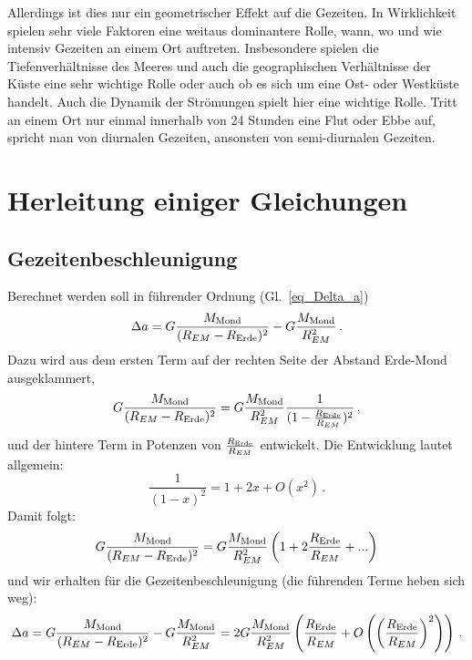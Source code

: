 Allerdings ist dies nur ein geometrischer Effekt auf die Gezeiten. In Wirklichkeit spielen
sehr viele Faktoren eine weitaus dominantere Rolle, wann, wo und wie intensiv Gezeiten an
einem Ort auftreten. Insbesondere spielen die Tiefenverh\"altnisse des Meeres und
auch die geographischen Verh\"altnisse der K\"uste eine sehr wichtige Rolle oder auch
ob es sich um eine Ost- oder Westk\"uste handelt. Auch die Dynamik der Str\"omungen spielt
hier eine wichtige Rolle. Tritt an einem Ort nur einmal innerhalb von 24 Stunden eine Flut oder Ebbe
auf, spricht man von diurnalen Gezeiten, ansonsten von semi-diurnalen Gezeiten. 


\section{Herleitung einiger Gleichungen}
\subsection{Gezeitenbeschleunigung}
\label{secA}

Berechnet werden soll in f\"uhrender Ordnung (Gl.\ \ref{eq_Delta_a})
\begin{equation}
                         \Delta a = G \frac{M_{\rm Mond}}{(R_{EM}-R_{\rm Erde})^2}  - 
                          G \frac{M_{\rm Mond}}{R_{EM}^2}   \, .
\end{equation} 
Dazu wird aus dem ersten Term auf der rechten Seite der Abstand Erde-Mond ausgeklammert,
\begin{equation}
           G \frac{M_{\rm Mond}}{(R_{EM}-R_{\rm Erde})^2} 
                  = G \frac{M_{\rm Mond}}{R_{EM}^2} \frac{1}{(1-\frac{R_{\rm Erde}}{R_{EM}})^2} \, , 
\end{equation} 
und der hintere Term in Potenzen von $\frac{R_{\rm Erde}}{R_{EM}}$ entwickelt. Die Entwicklung
lautet allgemein:
\begin{equation}
           \frac{1}{(1-x)^2} = 1 + 2x + O(x^2)  \, .
\end{equation}
Damit folgt:
\begin{equation}
           G \frac{M_{\rm Mond}}{(R_{EM}-R_{\rm Erde})^2} 
                  = G \frac{M_{\rm Mond}}{R_{EM}^2} \left( 1 + 2 \frac{R_{\rm Erde}}{R_{EM}} + ...\right)  
\end{equation} 
und wir erhalten f\"ur die Gezeitenbeschleunigung (die f\"uhrenden Terme heben sich weg): 
\begin{equation}
          \Delta a = G \frac{M_{\rm Mond}}{(R_{EM}-R_{\rm Erde})^2}  - 
       G \frac{M_{\rm Mond}}{R_{EM}^2}  =  2 G \frac{M_{\rm Mond}}{R_{EM}^2} \left( \frac{R_{\rm Erde}}{R_{EM}} 
          + O\left( \left(\frac{R_{\rm Erde}}{R_{EM}} \right)^2 \right) \right) \, .
\end{equation} 

